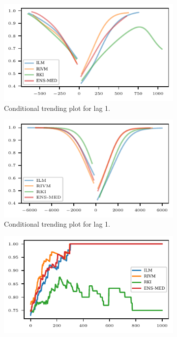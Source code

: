 \begin{figure}
    \centering
    \begin{subfigure}[t]{.48\textwidth}
    \includegraphics{plots/covid_nowcast/40_cond_prob_lag_1}
    \caption{Conditional trending plot for lag 1.}\label{fig:app-covid-cond-prob-1}
    \end{subfigure}\hfill
    \begin{subfigure}[t]{.48\textwidth}
    \includegraphics{plots/covid_nowcast/40_cond_prob_lag_14}
    \caption{Conditional trending plot for lag 1.}\label{fig:app-covid-cond-prob-14}
    \end{subfigure}
    \begin{subfigure}[t]{.48\textwidth}
    \includegraphics{plots/covid_nowcast/40_acc_eps_lag_1}

\end{subfigure}
\end{figure}
